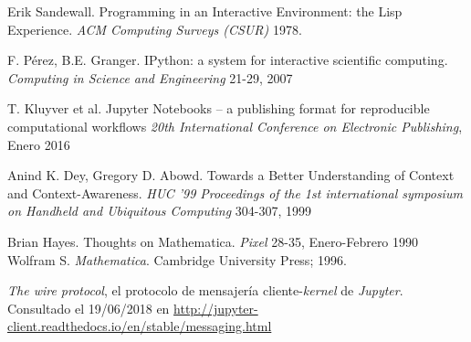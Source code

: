 \documentclass[11pt,spanish,listoffigures]{tfgetsinf}
\begin{document}
\begin{thebibliography}{10}
   Erik Sandewall.
   \newblock Programming in an Interactive Environment: the Lisp Experience.
   \newblock \textit{ACM Computing Surveys (CSUR)} 1978.
   
  	F. Pérez, B.E. Granger.
	\newblock IPython: a system for interactive scientific computing.
	\newblock \textit{Computing in Science and Engineering} 21-29, 2007 

  	T. Kluyver et al.
	\newblock Jupyter Notebooks – a publishing format for reproducible computational workflows
	\newblock \textit{20th International Conference on Electronic Publishing}, Enero 2016

  	Anind K. Dey, Gregory D. Abowd.
	\newblock Towards a Better Understanding of Context and Context-Awareness.
	\newblock \textit{HUC '99 Proceedings of the 1st international symposium on Handheld and Ubiquitous Computing} 304-307, 1999

  	Brian Hayes.
	\newblock Thoughts on Mathematica.
	\newblock \textit{Pixel} 28-35, Enero-Febrero 1990
   Wolfram S. 
   \newblock \textit{Mathematica}.
   \newblock Cambridge University Press; 1996.


	\textit{The wire protocol}, el protocolo de mensajería 
    cliente-\textit{kernel} de \textit{Jupyter}.
    \newblock Consultado el 19/06/2018 en
	\url{http://jupyter-client.readthedocs.io/en/stable/messaging.html}

\end{thebibliography}
\cleardoublepage


\APPENDIX


\end{document}
